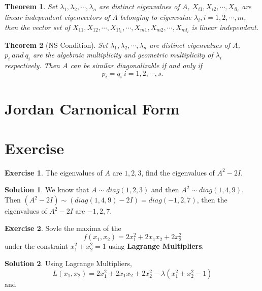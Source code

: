 \documentclass{article}
\newtheorem{theorem}{Theorem}[section]
\theoremstyle{definition}
\newtheorem{exe}{Exercise}[section]
\newtheorem{sol}{Solution}[exe]
\begin{document}
\begin{theorem}
Set $\lambda_{1},\lambda_{2},\cdots,\lambda_{n}$ are distinct eigenvalues of $A$, $X_{i1},X_{i2},\cdots,X_{il_{i}}$ 
are linear independent eigenvectors of $A$ belonging to eigenvalue $\lambda_{i},i=1,2,\cdots,m$, then the vector set of $X_{11},X_{12},\cdots,X_{1l_{1}},\cdots,X_{m1},X_{m2},\cdots,X_{ml_{l}}$ is linear independent.
\end{theorem}

\begin{theorem}[NS Condition]
    Set $\lambda_{1},\lambda_{2},\cdots,\lambda_{n}$ are distinct eigenvalues of $A$, $p_{i}\ and\ q_{i}$ are the algebraic multiplicity and geometric multiplicity of $\lambda_{i}$ respectively.
    Then $A$ can be similar diagonalizable if and only if
    $$p_{i}=q_{i}\ i=1,2,\cdots,s.$$
\end{theorem}





















\section{Jordan Carnonical Form}












\newpage
\section{Exercise}

\begin{exe}
The eigenvalues of $A$ are $1,2,3$, find the eigenvalues of $A^{2}-2I$.
\end{exe}

\begin{sol}
    We know that $A\sim diag(1,2,3)$ and then $A^{2}\sim diag(1,4,9)$.
    Then $(A^{2}-2I)\sim (diag(1,4,9)-2I)=diag(-1,2,7)$, then the eigenvalues 
    of $A^{2}-2I$ are $-1,2,7$.
\end{sol}

\begin{exe}
    Sovle the maxima of the $$f(x_{1},x_{2})=2x_{1}^{2}+2x_{1}x_{2}+2x_{2}^{2}$$
    under the constraint $x_{1}^{2}+x_{2}^{2}=1$ using \textbf{Lagrange Multipliers}.
\end{exe}

\begin{sol}
    Using Lagrange Multipliers,
    $$L(x_{1},x_{2})=2x_{1}^{2}+2x_{1}x_{2}+2x_{2}^{2}-\lambda(x_{1}^{2}+x_{2}^{2}-1)$$
    and 
    $$$$
\end{sol}
\end{document}
